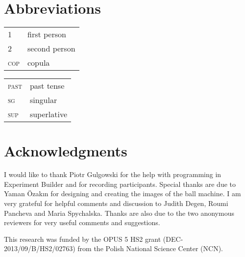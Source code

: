 \documentclass[output=paper]{langscibook}
\begin{document}
\section*{Abbreviations}

\begin{tabularx}{.5\textwidth}{@{}lX@{}}
\textsc{1}&first person\\
\textsc{2}&second person\\
\textsc{cop}&{copula}\\
\end{tabularx}%
\begin{tabularx}{.5\textwidth}{@{}lX@{}}
\textsc{past}&past tense\\
\textsc{sg}&singular\\
\textsc{sup}&superlative\\
\end{tabularx}

\section*{Acknowledgments}
I would like to thank Piotr Gulgowski for the help with programming in Experiment Builder and for recording
participants. Special thanks are due to Yaman Özakın for designing and creating the images of the ball machine. I am
very grateful for helpful comments and discussion to Judith Degen, Roumi Pancheva and Maria Spychalska. Thanks are also
due to the two anonymous reviewers for very useful comments and suggestions.

\begin{sloppypar}
This research was funded by the OPUS 5 HS2 grant (DEC-2013/09/B/HS2\slash 02763) from the Polish National Science Center
(NCN).
\end{sloppypar}

{\sloppy\printbibliography[heading=subbibliography,notkeyword=this]}
\end{document}
